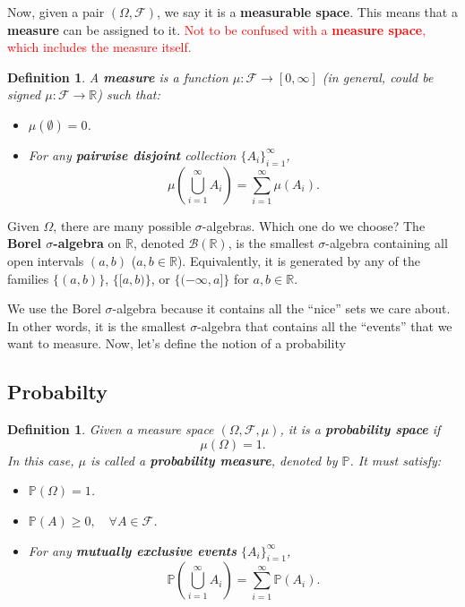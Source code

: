 \documentclass[twoside]{article}
\newcommand{\note}[1]{\textcolor{red}{#1}}
\newtheorem{definition}[theorem]{Definition}
\newcommand\F{\mathcal{F}}
\newcommand{\prob}{\mathbb{P}}
\begin{document}
Now, given a pair $(\Omega,\mathcal{F})$, we say it is a \textbf{measurable space}. This means that a \textbf{measure} can be assigned to it.  
\note{Not to be confused with a \textbf{measure space}, which includes the measure itself.}

\begin{definition}
    A \textbf{measure} is a function $\mu:\mathcal{F}\rightarrow [0,\infty]$ (in general, could be signed $\mu:\mathcal{F}\rightarrow \mathbb{R}$) such that:
    \begin{itemize}
        \item $\mu(\emptyset)=0$.
        \item For any \textbf{pairwise disjoint} collection $\{A_i\}_{i=1}^{\infty}$,
        \[
            \mu\!\left(\bigcup_{i=1}^\infty A_i\right)=\sum_{i=1}^\infty \mu(A_i).
        \]
    \end{itemize}
\end{definition}

Given $\Omega$, there are many possible $\sigma$-algebras. Which one do we choose?  
The \textbf{Borel $\sigma$-algebra} on $\mathbb{R}$, denoted $\mathcal{B}(\mathbb{R})$, is the smallest $\sigma$-algebra containing all open intervals $(a,b)$ ($a,b\in\mathbb{R}$). Equivalently, it is generated by any of the families
$\{(a,b)\}$, $\{[a,b)\}$, or $\{(-\infty,a]\}$ for $a,b\in\mathbb{R}$.

We use the Borel $\sigma$-algebra because it contains all the “nice” sets we care about. In other words, it is the smallest $\sigma$-algebra that contains all the “events” that we want to measure. Now, let's define the notion of a probability

\subsection{Probabilty}
\begin{definition}
    Given a measure space $(\Omega,\mathcal{F},\mu)$, it is a \textbf{probability space} if
    $$\mu(\Omega)=1.$$ 
    In this case, $\mu$ is called a \textbf{probability measure}, denoted by $\mathbb{P}$. It must satisfy:
    \begin{itemize}
        \item [(P1)] $\prob(\Omega) = 1$.
        \item [(P2)] $\prob(A)\geq 0, \quad \forall A\in \F$.
        \item [(P3)] For any \textbf{mutually exclusive events} $\{A_i\}_{i=1}^{\infty}$,
        \[
            \prob\!\left(\bigcup_{i=1}^\infty A_i\right)=\sum_{i=1}^\infty \prob(A_i).
        \]
    \end{itemize}
\end{definition}
\end{document}
